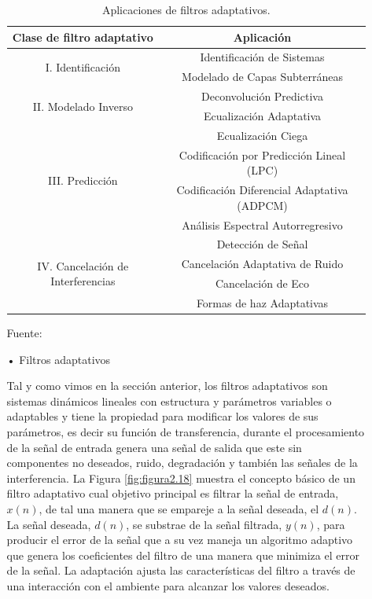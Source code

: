 \begin{enumerate}
\begin{enumerate}
\begin{center}
\begin{table}[h!]
\centering
\vskip -0.2cm
\caption{\small{Aplicaciones de filtros adaptativos.}}
\label{table:tabla23}
\begin{tabular}{|c|c|}
\hline
{\small Clase de filtro adaptativo} & {\small Aplicación}\\
\hline
\multirow{2}{*}{\small I. Identificación}&{\small Identificación de Sistemas}\\&{\small Modelado de Capas Subterráneas}\\
\hline
\multirow{2}{*}{\small II. Modelado Inverso}&{\small Deconvolución Predictiva}\\&{\small Ecualización Adaptativa}\\& {\small Ecualización Ciega}\\
\hline
\multirow{2}{*}{\small III. Predicción}&{\small Codificación por Predicción Lineal (LPC)}\\&{\small Codificación Diferencial	Adaptativa (ADPCM)}\\&{\small Análisis Espectral Autorregresivo}\\&{\small Detección de Señal}\\
\hline
\multirow{2}{*}{\small IV. Cancelación de Interferencias}&{\small Cancelación Adaptativa de Ruido}\\&{\small Cancelación de Eco}\\&{\small Formas de haz Adaptativas}\\
\hline
\end{tabular}
\begin{center}
\vskip 0.2cm
{\small{Fuente: \cite{walter}}}
\end{center}
\end{table}
\end{center}

\item[•]Filtros adaptativos
\par
Tal y como vimos en la sección anterior, los filtros adaptativos son sistemas dinámicos lineales con estructura y parámetros variables o adaptables y tiene la propiedad para modificar los valores de sus parámetros, es decir su función de transferencia, durante el procesamiento de la señal de entrada genera una señal de salida que este sin componentes no deseados, ruido, degradación y también las señales de la interferencia.
\vskip 0.5cm
La Figura \ref{fig:figura2.18} muestra el concepto básico de un filtro adaptativo cual objetivo principal es filtrar la señal de entrada, $x(n)$, de tal una manera que se empareje a la señal deseada, el $d(n)$. La señal deseada, $d(n)$, se substrae de la señal filtrada, $y(n)$, para producir el error de la señal que a su vez maneja un algoritmo adaptivo que genera los coeficientes del filtro de una manera que minimiza el error de la señal. La adaptación ajusta las características del filtro a través de una interacción con el ambiente para alcanzar los valores deseados.


\end{enumerate}
\end{enumerate}
